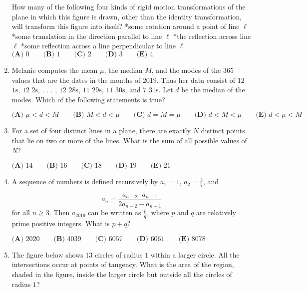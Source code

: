 \documentclass{article}
\begin{document}
\begin{enumerate}[label=\arabic*., itemsep=0.5em]
How many of the following four kinds of rigid motion transformations of the plane in which this figure is drawn, other than the identity transformation, will transform this figure into itself?
*some rotation around a point of line \(\ell\)
*some translation in the direction parallel to line \(\ell\)
*the reflection across line \(\ell\)
*some reflection across a line perpendicular to line \(\ell\)
\(\textbf{(A) } 0 \qquad\textbf{(B) } 1 \qquad\textbf{(C) } 2 \qquad\textbf{(D) } 3 \qquad\textbf{(E) } 4\)\par \vspace{0.5em}\item Melanie computes the mean \(\mu\), the median \(M\), and the modes of the \(365\) values that are the dates in the months of \(2019\). Thus her data consist of \(12\) \(1\text{s}\), \(12\) \(2\text{s}\), . . . , \(12\) \(28\text{s}\), \(11\) \(29\text{s}\), \(11\) \(30\text{s}\), and \(7\) \(31\text{s}\). Let \(d\) be the median of the modes. Which of the following statements is true?

\(\textbf{(A) } \mu < d < M \qquad\textbf{(B) } M < d < \mu \qquad\textbf{(C) } d = M =\mu \qquad\textbf{(D) } d < M < \mu \qquad\textbf{(E) } d < \mu < M\)\par \vspace{0.5em}\item For a set of four distinct lines in a plane, there are exactly \(N\) distinct points that lie on two or more of the lines. What is the sum of all possible values of \(N\)?

\(\textbf{(A) } 14 \qquad \textbf{(B) } 16 \qquad \textbf{(C) } 18 \qquad \textbf{(D) } 19 \qquad \textbf{(E) } 21\)\par \vspace{0.5em}\item A sequence of numbers is defined recursively by \(a_1 = 1\), \(a_2 = \frac{3}{7}\), and

\begin{equation*}
a_n=\frac{a_{n-2} \cdot a_{n-1}}{2a_{n-2} - a_{n-1}}
\end{equation*}
for all \(n \geq 3\). Then \(a_{2019}\) can be written as \(\frac{p}{q}\), where \(p\) and \(q\) are relatively prime positive integers. What is \(p+q ?\)

\(\textbf{(A) } 2020 \qquad\textbf{(B) } 4039 \qquad\textbf{(C) } 6057 \qquad\textbf{(D) } 6061 \qquad\textbf{(E) } 8078\)\par \vspace{0.5em}\item The figure below shows \(13\) circles of radius \(1\) within a larger circle. All the intersections occur at points of tangency. What is the area of the region, shaded in the figure, inside the larger circle but outside all the circles of radius \(1\)?



\end{enumerate}
\end{document}
